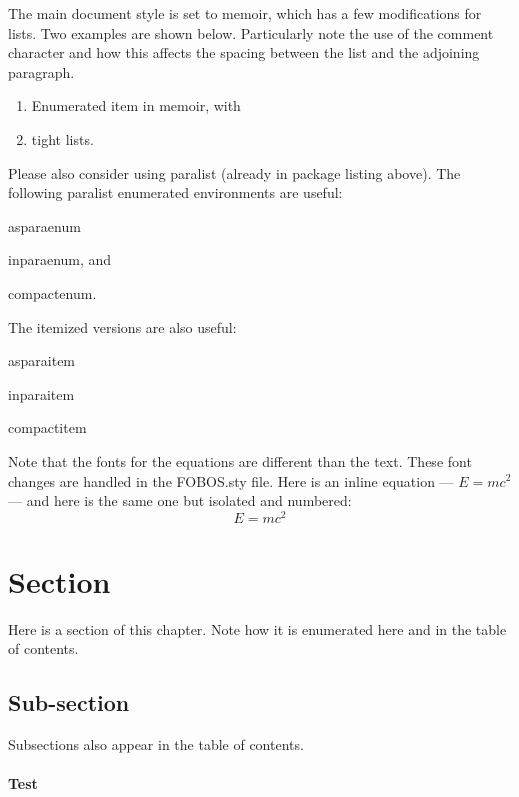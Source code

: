 \documentclass[11pt,a4paper,twoside,onecolumn,openany,final,oldfontcommands]{memoir}
\begin{document}
The main document style is set to {\ttfamily memoir}, which has a few
modifications for lists.  Two examples are shown below.  Particularly
note the use of the comment character and how this affects the spacing
between the list and the adjoining paragraph.

\tightlists
\begin{enumerate}
%
\item Enumerated item in {\ttfamily memoir}, with
%
\item tight lists.
%
\end{enumerate}
%
Please also consider using {\ttfamily paralist} (already in package listing above).  The following {\ttfamily paralist} enumerated environments are useful:
\begin{inparaenum}[(a)]
%
\item asparaenum
%
\item inparaenum, and
%
\item compactenum.
%
\end{inparaenum}
%
The itemized versions are also useful:
%
\begin{asparaitem}
%
\item asparaitem
%
\item inparaitem
%
\item compactitem
%
\end{asparaitem}
%
Note that the fonts for the equations are different than the text.  These font changes are handled in the {\ttfamily FOBOS.sty} file.  Here is an inline equation --- $E=mc^2$ --- and here is the same one but isolated and numbered:
%
\begin{equation}
E = m c^2
\end{equation}

\section{Section}

Here is a section of this chapter.  Note how it is enumerated here and in the table of contents.

\subsection{Sub-section}

Subsections also appear in the table of contents.

\paragraph{Test}
\end{document}

